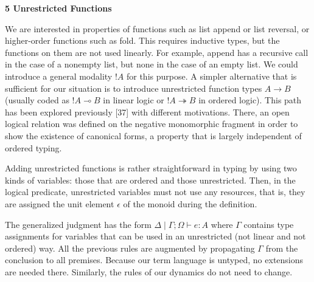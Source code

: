 \documentclass[10pt,a4paper]{amsart}
\begin{document}
 
 


 
\par\medskip\noindent\textbf{5 Unrestricted Functions}\par
 
 
We are interested in properties of functions such as list append or list reversal, or higher-order functions such as fold. This requires inductive types, but the functions on them are not used linearly. For example, append has a recursive call in the case of a nonempty list, but none in the case of an empty list. We could introduce a general modality ${!}A$ for this purpose. A simpler alternative that is sufficient for our situation is to introduce unrestricted function types $A\mathbin{\rightarrow}B$ (usually coded as ${!}A\multimap B$ in linear logic or ${!}A\twoheadrightarrow B$ in ordered logic). This path has been explored previously [37] with different motivations. There, an open logical relation was defined on the negative monomorphic fragment in order to show the existence of canonical forms, a property that is largely independent of ordered typing.\par
 
 
 
Adding unrestricted functions is rather straightforward in typing by using two kinds of variables: those that are ordered and those unrestricted. Then, in the logical predicate, unrestricted variables must not use any resources, that is, they are assigned the unit element $\epsilon$ of the monoid during the definition.\par
 
 
 
The generalized judgment has the form $\Delta\mid\Gamma\mathrel{;}\Omega\vdash e:A$ where $\Gamma$ contains type assignments for variables that can be used in an unrestricted (not linear and not ordered) way. All the previous rules are augmented by propagating $\Gamma$ from the conclusion to all premises. Because our term language is untyped, no extensions are needed there. Similarly, the rules of our dynamics do not need to change.\par
 
 
\end{document}
